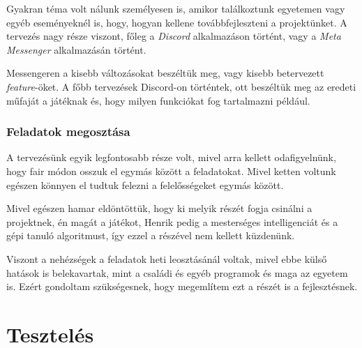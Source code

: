 \documentclass[]{thesis-ekf}
\theoremstyle{definition}
\begin{document}
	Gyakran téma volt nálunk személyesen is, amikor találkoztunk egyetemen vagy egyéb eseményeknél is, hogy, hogyan kellene továbbfejleszteni a projektünket. A tervezés nagy része viszont, főleg a \emph{Discord} alkalmazáson történt, vagy a \emph{Meta Messenger} alkalmazásán történt.
	
	Messengeren a kisebb változásokat beszéltük meg, vagy kisebb betervezett \emph{feature}-öket. A főbb tervezések Discord-on történtek, ott beszéltük meg az eredeti műfaját a játéknak és, hogy milyen funkciókat fog tartalmazni például.
	
	\subsection{Feladatok megosztása}
	A tervezésünk egyik legfontosabb része volt, mivel arra kellett odafigyelnünk, hogy fair módon osszuk el egymás között a feladatokat. Mivel ketten voltunk egészen könnyen el tudtuk felezni a felelősségeket egymás között.
	
	Mivel egészen hamar eldöntöttük, hogy ki melyik részét fogja csinálni a projektnek, én magát a játékot, Henrik pedig a mesterséges intelligenciát és a gépi tanuló algoritmust, így ezzel a részével nem kellett küzdenünk.
	
	Viszont a nehézségek a feladatok heti leosztásánál voltak, mivel ebbe külső hatások is belekavartak, mint a családi és egyéb programok és maga az egyetem is. Ezért gondoltam szükségesnek, hogy megemlítem ezt a részét is a fejlesztésnek.
	
	
	
	\chapter{Tesztelés}
	
\end{document}
